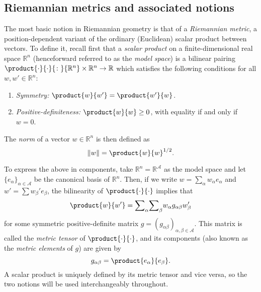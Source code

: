 \documentclass[reqno]{amsart}
\DeclarePairedDelimiter{\norm}{\lVert}{\rVert}
\theoremstyle{plain}
\theoremstyle{definition}
\theoremstyle{remark}
\numberwithin{equation}{section}
\numberwithin{theorem}{section}
\begin{document}
\subsection{Riemannian metrics and associated notions}
\label{sec:geometry}

The most basic notion in Riemannian geometry is that of a \emph{Riemannian metric}, a position-dependent variant of the ordinary (Euclidean) scalar product between vectors.
To define it, recall first that a \emph{scalar product} on a finite-dimensional real space ${{\mathbb{R}}^{n}}$ (henceforward referred to as the \emph{model space}) is a bilinear pairing $\product{\mathopen{}\cdot\mathopen{}}{\mathopen{}\cdot\mathopen{}}{\colon} {{\mathbb{R}}^{n}}\times {{\mathbb{R}}^{n}}\to {\mathbb{R}}$ which satisfies the following conditions for all $w,w'\in{{\mathbb{R}}^{n}}$:
\begin{enumerate}
\item
\emph{Symmetry:}
$\product{w}{w'} = \product{w'}{w}$.
\item
\emph{Positive-definiteness:}
$\product{w}{w} \geq 0$, with equality if and only if $w=0$.
\end{enumerate}
The \emph{norm} of a vector $w\in {{\mathbb{R}}^{n}}$ is then defined as
\begin{equation}
\label{eq:norm}
\norm{w}
	= \product{w}{w}^{1/2}.
\end{equation}

To express the above in components, take ${{\mathbb{R}}^{n}} = {\mathbb{R}}^{\mathcal{A}}$ as the model space and let $\{{e}_{\alpha}\}_{\alpha\in{\mathcal{A}}}$ be the canonical basis of ${{\mathbb{R}}^{n}}$.
Then, if we write $w = {\sum\nolimits}_{\alpha} w_{\alpha} {e}_{\alpha}$ and $w' = {\sum\nolimits} w_{\beta}' {e}_{\beta}$, the bilinearity of $\product{\mathopen{}\cdot\mathopen{}}{\mathopen{}\cdot\mathopen{}}$ implies that
\begin{equation}
\label{eq:scalar}
\product{w}{w'}
	= {\sum\nolimits}_{\alpha}{\sum\nolimits}_{\beta}w_{\alpha}  g_{\alpha\beta} w_{\beta}'
\end{equation}
for some symmetric positive-definite matrix $g = \left( g_{\alpha\beta} \right)_{\alpha,\beta\in{\mathcal{A}}}$.  This matrix is called the \emph{metric tensor} of $\product{\mathopen{}\cdot\mathopen{}}{\mathopen{}\cdot\mathopen{}}$, and its components (also known as the \emph{metric elements} of $g$) are given by
\begin{equation}
\label{eq:metric}
g_{\alpha\beta}
	= \product{{e}_{\alpha}}{{e}_{\beta}}.
\end{equation}
A scalar product is uniquely defined by its metric tensor and vice versa, so the two notions will be used interchangeably throughout.
\end{document}
